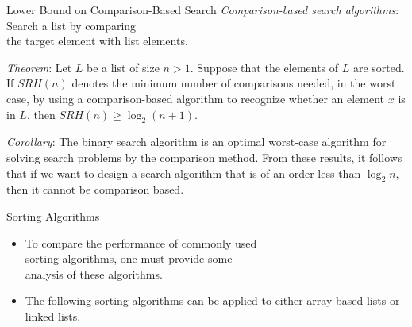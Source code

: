 \documentclass[14pt,aspectratio=1610]{beamer}
\begin{document}
\begin{frame}{Lower Bound on Comparison-Based Search}
\small
\emph{Comparison-based search algorithms}: Search a list by comparing \\the target element with list elements.
\pause{}

\emph{Theorem}: Let \(L\) be a list of size \(n > 1\). Suppose that the elements of \(L\) are sorted. If \(SRH(n)\) denotes the minimum number of comparisons needed, in the worst case, by using a comparison-based algorithm to recognize whether an element \(x\) is in \(L\), then \(SRH(n) \ge \log_2(n + 1)\).
\pause{}

\emph{Corollary}: The binary search algorithm is an optimal worst-case algorithm for solving search problems by the comparison method.
From these results, it follows that if we want to design a search algorithm that is of an order less than \(\log_2{n}\), then it cannot be comparison based.
\end{frame}

\begin{frame}{Sorting Algorithms}

\begin{itemize}\setlength\itemsep{0.5em}
  \item
    To compare the performance of commonly used\\
    sorting algorithms, one must provide some\\ analysis of these algorithms.
  \item
    The following sorting algorithms can be applied to either array-based lists or linked lists.
\end{itemize}
\end{frame}
\end{document}
